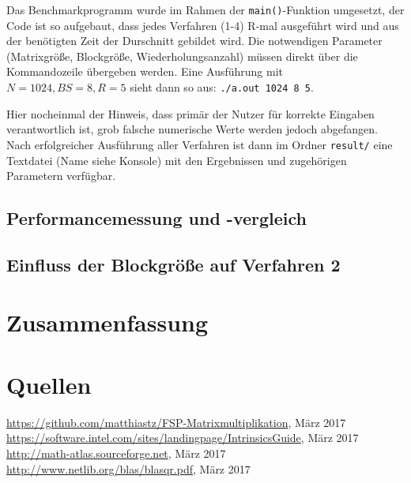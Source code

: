 \documentclass[a4paper,11pt]{scrartcl}
\begin{document}
Das Benchmarkprogramm wurde im Rahmen der \texttt{main()}-Funktion umgesetzt,
der Code ist so aufgebaut, dass jedes Verfahren (1-4) R-mal ausgeführt wird
und aus der benötigten Zeit der Durschnitt gebildet wird. Die notwendigen Parameter
(Matrixgröße, Blockgröße, Wiederholungsanzahl) müssen direkt über die Kommandozeile übergeben werden.
Eine Ausführung mit $N = 1024, BS = 8, R = 5$ sieht dann so aus: \texttt{./a.out 1024 8 5}.
\newline

Hier nocheinmal der Hinweis, dass primär der Nutzer für korrekte Eingaben verantwortlich ist, 
grob falsche numerische Werte werden jedoch abgefangen.
Nach erfolgreicher Ausführung aller Verfahren ist dann im Ordner \texttt{result/} eine Textdatei (Name
siehe Konsole) mit den Ergebnissen und zugehörigen Parametern verfügbar.


\subsection{Performancemessung und -vergleich}

\subsection{Einfluss der Blockgröße auf Verfahren 2}



\section{Zusammenfassung}

\section{Quellen}
\begin{thebibliography}{9}

 \url{https://github.com/matthiastz/FSP-Matrixmultiplikation}, März 2017
 \url{https://software.intel.com/sites/landingpage/IntrinsicsGuide}, März 2017
 \url{http://math-atlas.sourceforge.net}, März 2017
 \url{http://www.netlib.org/blas/blasqr.pdf}, März 2017

\end{thebibliography}
\end{document}
